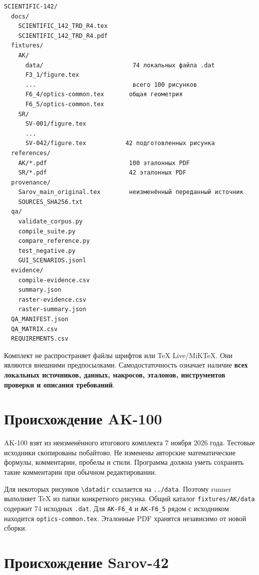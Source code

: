 \documentclass[11pt,a4paper,oneside]{scrreprt}
\begin{document}
\begin{verbatim}
SCIENTIFIC-142/
  docs/
    SCIENTIFIC_142_TRD_R4.tex
    SCIENTIFIC_142_TRD_R4.pdf
  fixtures/
    AK/
      data/                         74 локальных файла .dat
      F3_1/figure.tex
      ...                           всего 100 рисунков
      F6_4/optics-common.tex       общая геометрия
      F6_5/optics-common.tex
    SR/
      SV-001/figure.tex
      ...
      SV-042/figure.tex           42 подготовленных рисунка
  references/
    AK/*.pdf                       100 эталонных PDF
    SR/*.pdf                       42 эталонных PDF
  provenance/
    Sarov_main_original.tex        неизменённый переданный источник
    SOURCES_SHA256.txt
  qa/
    validate_corpus.py
    compile_suite.py
    compare_reference.py
    test_negative.py
    GUI_SCENARIOS.jsonl
  evidence/
    compile-evidence.csv
    summary.json
    raster-evidence.csv
    raster-summary.json
  QA_MANIFEST.json
  QA_MATRIX.csv
  REQUIREMENTS.csv
\end{verbatim}

Комплект не распространяет файлы шрифтов или TeX Live/MiKTeX. Они являются внешними предпосылками. Самодостаточность означает наличие \textbf{всех локальных источников, данных, макросов, эталонов, инструментов проверки и описания требований}.

\section{Происхождение AK-100}\label{ux43fux440ux43eux438ux441ux445ux43eux436ux434ux435ux43dux438ux435-ak-100}

AK-100 взят из неизменённого итогового комплекта 7 ноября 2026 года. Тестовые исходники скопированы побайтово. Не изменены авторские математические формулы, комментарии, пробелы и стили. Программа должна уметь сохранять такие комментарии при обычном редактировании.

Для некоторых рисунков \texttt{\textbackslash{}datadir} ссылается на \texttt{../data}. Поэтому runner выполняет TeX из папки конкретного рисунка. Общий каталог \texttt{fixtures/AK/data} содержит 74 исходных \texttt{.dat}. Для \texttt{AK-F6\_4} и \texttt{AK-F6\_5} рядом с исходником находится \texttt{optics-common.tex}. Эталонные PDF хранятся независимо от новой сборки.

\section{Происхождение Sarov-42}\label{ux43fux440ux43eux438ux441ux445ux43eux436ux434ux435ux43dux438ux435-sarov-42}
\end{document}
